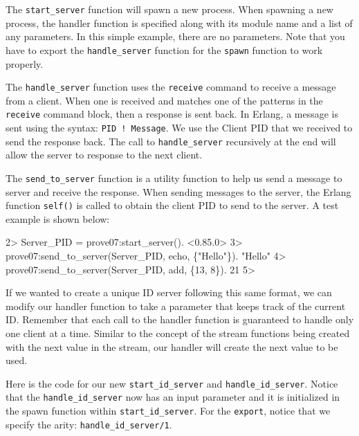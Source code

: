\documentclass[
]{book}
\newenvironment{Shaded}{\begin{snugshade}}{\end{snugshade}}
\newcommand{\NormalTok}[1]{#1}
\begin{document}
The \texttt{start\_server} function will spawn a new process. When spawning a new process, the handler function is specified along with its module name and a list of any parameters. In this simple example, there are no parameters. Note that you have to export the \texttt{handle\_server} function for the \texttt{spawn} function to work properly.

The \texttt{handle\_server} function uses the \texttt{receive} command to receive a message from a client. When one is received and matches one of the patterns in the \texttt{receive} command block, then a response is sent back. In Erlang, a message is sent using the syntax: \texttt{PID\ !\ Message}. We use the Client PID that we received to send the response back. The call to \texttt{handle\_server} recursively at the end will allow the server to response to the next client.

The \texttt{send\_to\_server} function is a utility function to help us send a message to server and receive the response. When sending messages to the server, the Erlang function \texttt{self()} is called to obtain the client PID to send to the server. A test example is shown below:

\begin{Shaded}
\begin{Highlighting}[]
\NormalTok{2\textgreater{} Server\_PID = prove07:start\_server().}
\NormalTok{\textless{}0.85.0\textgreater{}}
\NormalTok{3\textgreater{} prove07:send\_to\_server(Server\_PID, echo, \{"Hello"\}).}
\NormalTok{"Hello"}
\NormalTok{4\textgreater{} prove07:send\_to\_server(Server\_PID, add, \{13, 8\}).    }
\NormalTok{21}
\NormalTok{5\textgreater{}}
\end{Highlighting}
\end{Shaded}

If we wanted to create a unique ID server following this same format, we can modify our handler function to take a parameter that keeps track of the current ID. Remember that each call to the handler function is guaranteed to handle only one client at a time. Similar to the concept of the stream functions being created with the next value in the stream, our handler will create the next value to be used.

Here is the code for our new \texttt{start\_id\_server} and \texttt{handle\_id\_server}. Notice that the \texttt{handle\_id\_server} now has an input parameter and it is initialized in the spawn function within \texttt{start\_id\_server}. For the \texttt{export}, notice that we specify the arity: \texttt{handle\_id\_server/1}.
\end{document}
